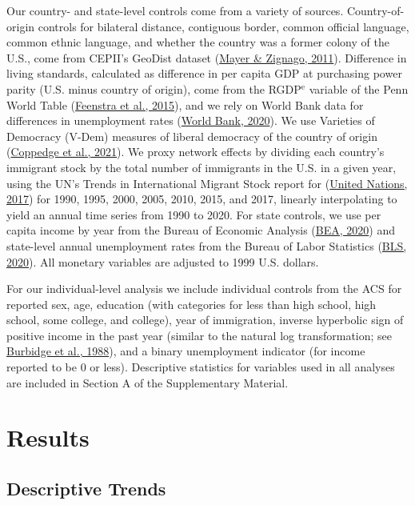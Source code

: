 \documentclass[
  12pt,
]{article}
\begin{document}
Our country- and state-level controls come from a variety of sources. Country-of-origin controls for bilateral distance, contiguous border, common official language, common ethnic language, and whether the country was a former colony of the U.S., come from CEPII's GeoDist dataset (\protect\hyperlink{ref-mayer_2011}{Mayer \& Zignago, 2011}). Difference in living standards, calculated as difference in per capita GDP at purchasing power parity (U.S. minus country of origin), come from the RGDP\(^\text{e}\) variable of the Penn World Table (\protect\hyperlink{ref-feenstra_2015}{Feenstra et al., 2015}), and we rely on World Bank data for differences in unemployment rates (\protect\hyperlink{ref-worldbank_2020}{World Bank, 2020}). We use Varieties of Democracy (V-Dem) measures of liberal democracy of the country of origin (\protect\hyperlink{ref-coppedge_2021}{Coppedge et al., 2021}). We proxy network effects by dividing each country's immigrant stock by the total number of immigrants in the U.S. in a given year, using the UN's Trends in International Migrant Stock report for (\protect\hyperlink{ref-unitednations_2017}{United Nations, 2017}) for 1990, 1995, 2000, 2005, 2010, 2015, and 2017, linearly interpolating to yield an annual time series from 1990 to 2020. For state controls, we use per capita income by year from the Bureau of Economic Analysis (\protect\hyperlink{ref-bea_2020}{BEA, 2020}) and state-level annual unemployment rates from the Bureau of Labor Statistics (\protect\hyperlink{ref-bls_2020}{BLS, 2020}). All monetary variables are adjusted to 1999 U.S. dollars.

For our individual-level analysis we include individual controls from the ACS for reported sex, age, education (with categories for less than high school, high school, some college, and college), year of immigration, inverse hyperbolic sign of positive income in the past year (similar to the natural log transformation; see \protect\hyperlink{ref-burbidge_1988_alternative}{Burbidge et al., 1988}), and a binary unemployment indicator (for income reported to be 0 or less). Descriptive statistics for variables used in all analyses are included in Section A of the Supplementary Material.

\hypertarget{results}{%
\section{Results}\label{results}}

\hypertarget{descriptive-trends}{%
\subsection{Descriptive Trends}\label{descriptive-trends}}
\end{document}
